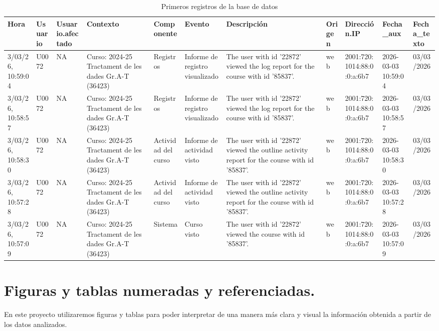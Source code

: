 \documentclass[notspecified,article,submit,moreauthors,pdftex]{Definitions/mdpi}
\begin{document}
\begin{longtable}[t]{lllllllllll}
\caption{\label{tab:unnamed-chunk-1}Primeros registros de la base de datos}\\
\toprule
Hora & Usuario & Usuario.afectado & Contexto & Componente & Evento & Descripción & Origen & Dirección.IP & Fecha\_aux & Fecha\_texto\\
\midrule
3/03/26, 10:59:04 & U0072 & NA & Curso: 2024-25 Tractament de les dades Gr.A-T (36423) & Registros & Informe de registro visualizado & The user with id '22872' viewed the log report for the course with id '85837'. & web & 2001:720:1014:88:0:0:a:6b7 & 2026-03-03 10:59:04 & 03/03/2026\\
3/03/26, 10:58:57 & U0072 & NA & Curso: 2024-25 Tractament de les dades Gr.A-T (36423) & Registros & Informe de registro visualizado & The user with id '22872' viewed the log report for the course with id '85837'. & web & 2001:720:1014:88:0:0:a:6b7 & 2026-03-03 10:58:57 & 03/03/2026\\
3/03/26, 10:58:30 & U0072 & NA & Curso: 2024-25 Tractament de les dades Gr.A-T (36423) & Actividad del curso & Informe de actividad visto & The user with id '22872' viewed the outline activity report for the course with id '85837'. & web & 2001:720:1014:88:0:0:a:6b7 & 2026-03-03 10:58:30 & 03/03/2026\\
3/03/26, 10:57:28 & U0072 & NA & Curso: 2024-25 Tractament de les dades Gr.A-T (36423) & Actividad del curso & Informe de actividad visto & The user with id '22872' viewed the outline activity report for the course with id '85837'. & web & 2001:720:1014:88:0:0:a:6b7 & 2026-03-03 10:57:28 & 03/03/2026\\
3/03/26, 10:57:09 & U0072 & NA & Curso: 2024-25 Tractament de les dades Gr.A-T (36423) & Sistema & Curso visto & The user with id '22872' viewed the course with id '85837'. & web & 2001:720:1014:88:0:0:a:6b7 & 2026-03-03 10:57:09 & 03/03/2026\\
\bottomrule
\end{longtable}

\section{Figuras y tablas numeradas y
referenciadas.}\label{figuras-y-tablas-numeradas-y-referenciadas.}

En este proyecto utilizaremos figuras y tablas para poder interpretar de
una manera más clara y visual la información obtenida a partir de los
datos analizados.
\end{document}
